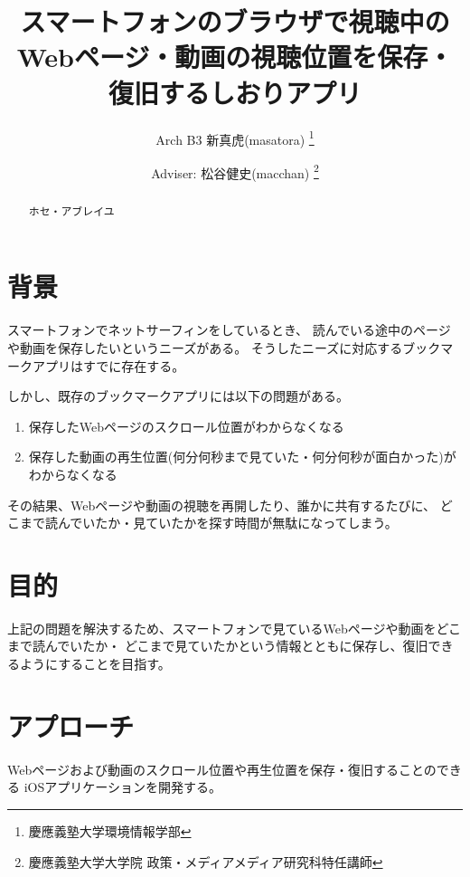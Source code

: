 \documentclass[a4j,10pt]{jsarticle}
\begin{document}

\title{スマートフォンのブラウザで視聴中のWebページ・動画の視聴位置を保存・復旧するしおりアプリ}

\author{
    Arch B3 新真虎(masatora) \thanks{慶應義塾大学環境情報学部}
    \and
    Adviser: 松谷健史(macchan) \thanks{慶應義塾大学大学院 政策・メディアメディア研究科特任講師}
}

\begin{abstract}
ホセ・アブレイユ
\end{abstract}

\maketitle
\thispagestyle{empty}

\section{背景}
スマートフォンでネットサーフィンをしているとき、
読んでいる途中のページや動画を保存したいというニーズがある\cite{example}。
そうしたニーズに対応するブックマークアプリはすでに存在する\cite{Pocket}。

しかし、既存のブックマークアプリには以下の問題がある。
\begin{enumerate}
\item 保存したWebページのスクロール位置がわからなくなる
\item 保存した動画の再生位置(何分何秒まで見ていた・何分何秒が面白かった)がわからなくなる
\end{enumerate}

その結果、Webページや動画の視聴を再開したり、誰かに共有するたびに、
どこまで読んでいたか・見ていたかを探す時間が無駄になってしまう。


\section{目的}
上記の問題を解決するため、スマートフォンで見ているWebページや動画をどこまで読んでいたか・
どこまで見ていたかという情報とともに保存し、復旧できるようにすることを目指す。

\section{アプローチ}
Webページおよび動画のスクロール位置や再生位置を保存・復旧することのできる
iOSアプリケーションを開発する\cite{example}。
\end{document}
